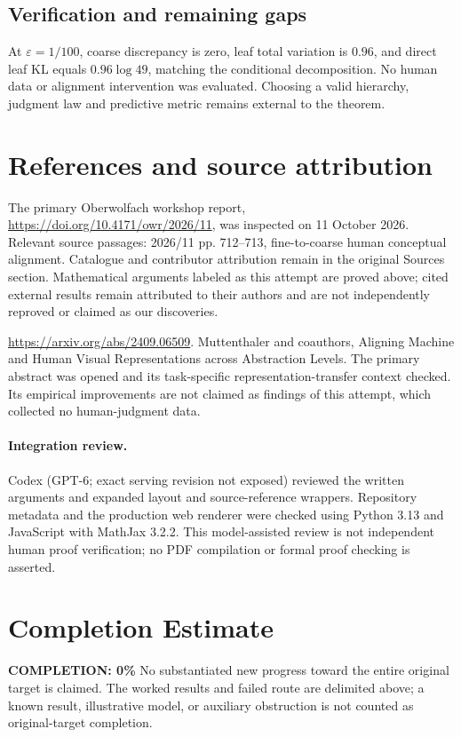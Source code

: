 \documentclass[11pt]{article}
\begin{document}
\subsection{Verification and remaining gaps}
At $\varepsilon=1/100$, coarse discrepancy is zero, leaf total variation is $0.96$, and direct leaf KL equals $0.96\log49$, matching the conditional decomposition. No human data or alignment intervention was evaluated. Choosing a valid hierarchy, judgment law and predictive metric remains external to the theorem.

\section{References and source attribution}
The primary Oberwolfach workshop report, \url{https://doi.org/10.4171/owr/2026/11}, was inspected on 11 October 2026. Relevant source passages: 2026/11 pp. 712--713, fine-to-coarse human conceptual alignment. Catalogue and contributor attribution remain in the original Sources section. Mathematical arguments labeled as this attempt are proved above; cited external results remain attributed to their authors and are not independently reproved or claimed as our discoveries.

\url{https://arxiv.org/abs/2409.06509}. Muttenthaler and coauthors, Aligning Machine and Human Visual Representations across Abstraction Levels. The primary abstract was opened and its task-specific representation-transfer context checked. Its empirical improvements are not claimed as findings of this attempt, which collected no human-judgment data.


\paragraph{Integration review.} Codex (GPT-6; exact serving revision not exposed) reviewed the written arguments and expanded layout and source-reference wrappers. Repository metadata and the production web renderer were checked using Python 3.13 and JavaScript with MathJax 3.2.2. This model-assisted review is not independent human proof verification; no PDF compilation or formal proof checking is asserted.

\section{Completion Estimate}
\noindent\textbf{COMPLETION: 0\%}
No substantiated new progress toward the entire original target is claimed. The worked results and failed route are delimited above; a known result, illustrative model, or auxiliary obstruction is not counted as original-target completion.
\end{document}
